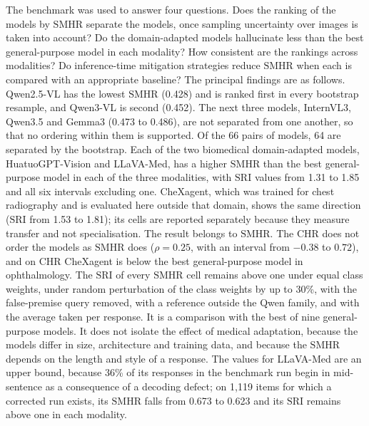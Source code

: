 \documentclass[11pt,a4paper]{article}
\newcommand{\SMHR}{\ensuremath{\mathrm{SMHR}}}
\newcommand{\CHR}{\ensuremath{\mathrm{CHR}}}
\newcommand{\SRI}{\ensuremath{\mathrm{SRI}}}
\begin{document}
The benchmark was used to answer four questions. Does the ranking of the models by \SMHR{} separate the models, once sampling uncertainty over images is taken into account? Do the domain-adapted models hallucinate less than the best general-purpose model in each modality? How consistent are the rankings across modalities? Do inference-time mitigation strategies reduce \SMHR{} when each is compared with an appropriate baseline? The principal findings are as follows.
Qwen2.5-VL has the lowest \SMHR{} (0.428) and is ranked first in every bootstrap resample, and Qwen3-VL is second (0.452). The next three models, InternVL3, Qwen3.5 and Gemma3 (0.473 to 0.486), are not separated from one another, so that no ordering within them is supported. Of the 66 pairs of models, 64 are separated by the bootstrap. Each of the two biomedical domain-adapted models, HuatuoGPT-Vision and LLaVA-Med, has a higher \SMHR{} than the best general-purpose model in each of the three modalities, with \SRI{} values from 1.31 to 1.85 and all six intervals excluding one. CheXagent, which was trained for chest radiography and is evaluated here outside that domain, shows the same direction (\SRI{} from 1.53 to 1.81); its cells are reported separately because they measure transfer and not specialisation. The result belongs to \SMHR{}. The \CHR{} does not order the models as \SMHR{} does ($\rho=0.25$, with an interval from $-0.38$ to $0.72$), and on \CHR{} CheXagent is below the best general-purpose model in ophthalmology. The \SRI{} of every \SMHR{} cell remains above one under equal class weights, under random perturbation of the class weights by up to 30\%, with the false-premise query removed, with a reference outside the Qwen family, and with the average taken per response. It is a comparison with the best of nine general-purpose models. It does not isolate the effect of medical adaptation, because the models differ in size, architecture and training data, and because the \SMHR{} depends on the length and style of a response. The values for LLaVA-Med are an upper bound, because 36\% of its responses in the benchmark run begin in mid-sentence as a consequence of a decoding defect; on 1{,}119 items for which a corrected run exists, its \SMHR{} falls from 0.673 to 0.623 and its \SRI{} remains above one in each modality.
\end{document}
